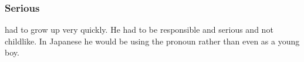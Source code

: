 \subsubsection{Serious}
\Thanatzil had to grow up very quickly. 
He had to be responsible and serious and not childlike.
In Japanese he would be using the pronoun \emph{} rather than \emph{} even as a young boy. 































